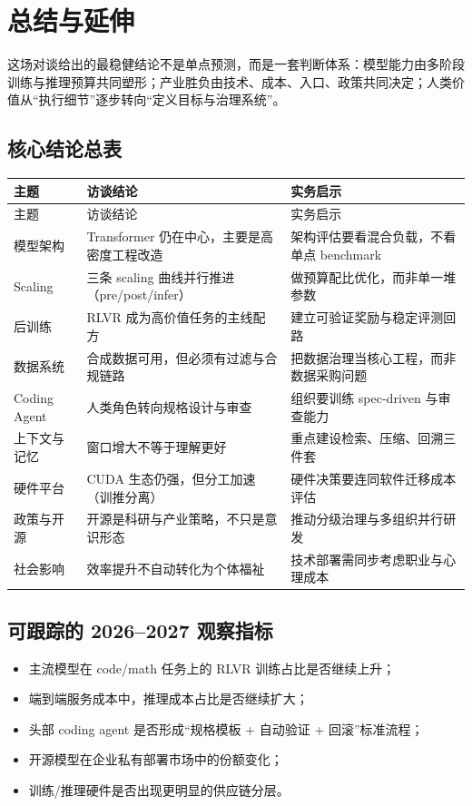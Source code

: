 \section{总结与延伸}

这场对谈给出的最稳健结论不是单点预测，而是一套判断体系：模型能力由多阶段训练与推理预算共同塑形；产业胜负由技术、成本、入口、政策共同决定；人类价值从“执行细节”逐步转向“定义目标与治理系统”。

\subsection{核心结论总表}

\begin{longtable}{p{}p{}p{}}
\toprule
主题 & 访谈结论 & 实务启示 \\
\midrule
\endfirsthead
\toprule
主题 & 访谈结论 & 实务启示 \\
\midrule
\endhead
模型架构 & Transformer 仍在中心，主要是高密度工程改造 & 架构评估要看混合负载，不看单点 benchmark \\
Scaling & 三条 scaling 曲线并行推进（pre/post/infer） & 做预算配比优化，而非单一堆参数 \\
后训练 & RLVR 成为高价值任务的主线配方 & 建立可验证奖励与稳定评测回路 \\
数据系统 & 合成数据可用，但必须有过滤与合规链路 & 把数据治理当核心工程，而非数据采购问题 \\
Coding Agent & 人类角色转向规格设计与审查 & 组织要训练 spec-driven 与审查能力 \\
上下文与记忆 & 窗口增大不等于理解更好 & 重点建设检索、压缩、回溯三件套 \\
硬件平台 & CUDA 生态仍强，但分工加速（训推分离） & 硬件决策要连同软件迁移成本评估 \\
政策与开源 & 开源是科研与产业策略，不只是意识形态 & 推动分级治理与多组织并行研发 \\
社会影响 & 效率提升不自动转化为个体福祉 & 技术部署需同步考虑职业与心理成本 \\
\bottomrule
\end{longtable}

\subsection{可跟踪的 2026--2027 观察指标}

\begin{itemize}[leftmargin=1.5em]
    \item 主流模型在 code/math 任务上的 RLVR 训练占比是否继续上升；
    \item 端到端服务成本中，推理成本占比是否继续扩大；
    \item 头部 coding agent 是否形成“规格模板 + 自动验证 + 回滚”标准流程；
    \item 开源模型在企业私有部署市场中的份额变化；
    \item 训练/推理硬件是否出现更明显的供应链分层。
\end{itemize}

